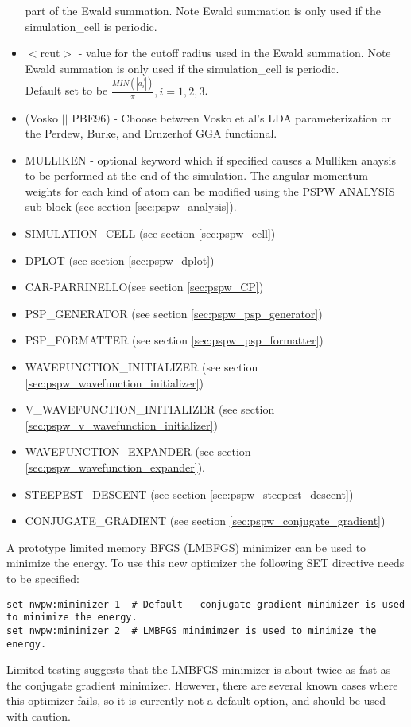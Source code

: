 \begin{itemize}
                          part of the Ewald summation. Note Ewald summation
                          is only used if the simulation\_cell is periodic.
        \item $<$rcut$>$ - value for the cutoff radius used
                          in the Ewald summation. Note Ewald summation
                          is only used if the simulation\_cell is periodic. \\
                           Default set to be
                          $\frac{MIN(\left| \vec{a_i} \right|)}{\pi}, i=1,2,3$.
        \item (Vosko $||$ PBE96) - Choose between Vosko et al's LDA 
                               parameterization or the Perdew, Burke, 
                               and Ernzerhof GGA functional.
        \item MULLIKEN - optional keyword which if specified
                         causes a Mulliken anaysis to be performed at
                         the end of the simulation.  The angular momentum
                         weights for each kind of atom can be modified using 
                         the PSPW ANALYSIS sub-block (see section \ref{sec:pspw_analysis}).

        \item SIMULATION\_CELL (see section \ref{sec:pspw_cell})
        \item DPLOT (see section \ref{sec:pspw_dplot})
        \item CAR-PARRINELLO(see section \ref{sec:pspw_CP})
        \item PSP\_GENERATOR (see section \ref{sec:pspw_psp_generator})
        \item PSP\_FORMATTER (see section \ref{sec:pspw_psp_formatter})
        \item WAVEFUNCTION\_INITIALIZER (see section \ref{sec:pspw_wavefunction_initializer})
        \item V\_WAVEFUNCTION\_INITIALIZER (see section \ref{sec:pspw_v_wavefunction_initializer})
        \item WAVEFUNCTION\_EXPANDER (see section \ref{sec:pspw_wavefunction_expander}).
        \item STEEPEST\_DESCENT (see section \ref{sec:pspw_steepest_descent})
        \item CONJUGATE\_GRADIENT (see section \ref{sec:pspw_conjugate_gradient})
\end{itemize}

A prototype limited memory BFGS (LMBFGS) minimizer can be used to minimize the energy.  To
use this new optimizer the following SET directive needs to be specified:
\begin{verbatim}
set nwpw:mimimizer 1  # Default - conjugate gradient minimizer is used to minimize the energy.
set nwpw:mimimizer 2  # LMBFGS minimimzer is used to minimize the energy.
\end{verbatim}
Limited testing suggests that the LMBFGS minimizer is about twice as fast as
the conjugate gradient minimizer.  However, there are several known cases
where this optimizer fails, so it is currently not a default option, and
should be used with caution.

